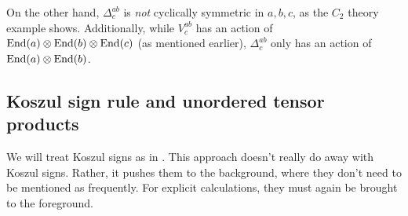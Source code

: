 On the other hand, $\Delta^{ab}_c$ is {\it not} cyclically symmetric in $a,b,c$, as the $C_2$ theory example shows. 
Additionally, while $V^{ab}_c$ has an action of $\text{End}(a)\otimes\text{End}(b)\otimes\text{End}(c)$ (as mentioned earlier), $\Delta^{ab}_c$
only has an action of $\text{End}(a)\otimes\text{End}(b)$.





\subsection{Koszul sign rule and unordered tensor products} \label{koszul_signs}

We will treat Koszul signs as in \cite[Section 1.2]{deligne1999}.
This approach doesn't really do away with Koszul signs.
Rather, it pushes them to the background, where they don't need to be mentioned as frequently.
For explicit calculations, they must again be brought to the foreground.

